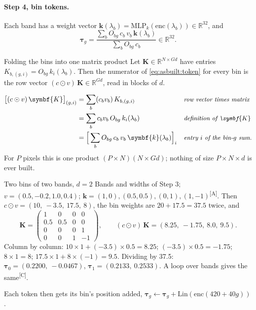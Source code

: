 \documentclass[11pt,a4paper,oneside,openany]{book}
\newcommand{\B}[1]{{\symbf{#1}}}
\newcommand{\B}[1]{{\bm{#1}}}
\newcommand{\comp}{\textsuperscript{\textsf{\scriptsize[C]}}}
\newcommand{\assm}{\textsuperscript{\textsf{\scriptsize[A]}}}
\newcommand{\R}{\mathbb{R}}
\newcommand{\why}[1]{&&\text{\small\itshape #1}}
\begin{document}
\paragraph{Step 4, bin tokens.} Each band has a weight vector $\B{k}(\lambda_b)=\mathrm{MLP}_k(\mathrm{enc}(\lambda_b))\in\R^{32}$, and
\begin{equation}
\B{\tau}_g=\frac{\sum_b O_{bg}\,c_b\,v_b\,\B{k}(\lambda_b)}{\sum_bO_{bg}\,c_b}\in\R^{32}.
\label{eq:asbuilt:token}
\end{equation}

\begin{rulebox}[label=rule:fold]{Folding the bins into one matrix product}
Let $\B{K}\in\R^{N\times Gd}$ have entries $K_{b,(g,i)}=O_{bg}\,k_i(\lambda_b)$. Then the numerator of \cref{eq:asbuilt:token} for every bin is the row vector
$(c\odot v)\,\B{K}\in\R^{Gd}$, read in blocks of $d$.
\end{rulebox}
\begin{align*}
\big[(c\odot v)\,\B{K}\big]_{(g,i)} &= \sum_b (c_bv_b)\,K_{b,(g,i)} \why{row vector times matrix}\\
&= \sum_b c_bv_b\,O_{bg}\,k_i(\lambda_b) \why{definition of $\B{K}$}\\
&= \Big[\sum_b O_{bg}\,c_b\,v_b\,\B{k}(\lambda_b)\Big]_i \why{entry $i$ of the bin-$g$ sum.}
\end{align*}
For $P$ pixels this is one product $(P\times N)(N\times Gd)$; nothing of size $P\times N\times d$ is ever built.

\begin{worked}[label=we:asbuilt:fold]{Two bins of two bands, $d=2$}
Bands and widths of Step 3; $v=(0.5,-0.2,1.0,0.4)$; $\B{k}=(1,0),(0.5,0.5),(0,1),(1,-1)$\assm. Then $c\odot v=(10,\ -3.5,\ 17.5,\ 8)$, the bin weights are
$20+17.5=37.5$ twice, and
\[
\B{K}=\begin{pmatrix}1&0&0&0\\0.5&0.5&0&0\\0&0&0&1\\0&0&1&-1\end{pmatrix},\qquad (c\odot v)\,\B{K}=(8.25,\ -1.75,\ 8.0,\ 9.5).
\]
Column by column: $10\times1+(-3.5)\times0.5=8.25$; $(-3.5)\times0.5=-1.75$; $8\times1=8$; $17.5\times1+8\times(-1)=9.5$. Dividing by 37.5:
$\B{\tau}_0=(0.2200,\ -0.0467)$, $\B{\tau}_1=(0.2133,\ 0.2533)$. A loop over bands gives the same\comp.
\end{worked}

Each token then gets its bin's position added, $\B{\tau}_g\leftarrow\B{\tau}_g+\mathrm{Lin}(\mathrm{enc}(420+40g))$.
\end{document}
